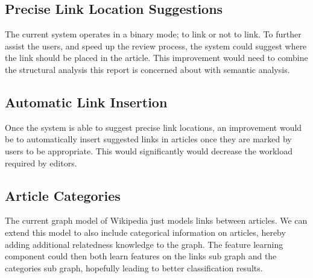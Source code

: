 \subsection{Precise Link Location Suggestions}
The current system operates in a binary mode; to link or not to link. To further assist the users, and speed up the review process, the system could suggest where the link should be placed in the article. This improvement would need to combine the structural analysis this report is concerned about with semantic analysis.

\subsection{Automatic Link Insertion}
Once the system is able to suggest precise link locations, an improvement would be to automatically insert suggested links in articles once they are marked by users to be appropriate. This would significantly would decrease the workload required by editors.

\subsection{Article Categories}
The current graph model of Wikipedia just models links between articles. We can extend this model to also include categorical information on articles, hereby adding additional relatedness knowledge to the graph. The feature learning component could then both learn features on the links sub graph and the categories sub graph, hopefully leading to better classification results.